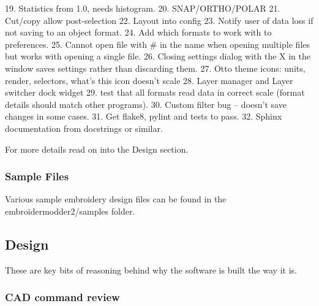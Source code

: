 \documentclass[a4paper, 11pt]{report}
\begin{document}
\begin{enumerate}
19. Statistics from 1.0, needs histogram.
20. SNAP/ORTHO/POLAR
21. Cut/copy allow post-selection
22. Layout into config
23. Notify user of data loss if not saving to an object format.
24. Add which formats to work with to preferences.
25. Cannot open file with \# in the name when opening multiple files but works with opening a single file.
26. Closing settings dialog with the X in the window saves settings rather than discarding them.
27. Otto theme icons: units, render, selectors, what's this icon doesn't scale
28. Layer manager and Layer switcher dock widget
29. test that all formats read data in correct scale (format details should match other programs).
30. Custom filter bug -- doesn't save changes in some cases.
31. Get flake8, pylint and tests to pass.
32. Sphinx documentation from docstrings or similar.
\end{enumerate}

For more details read on into the Design section.

\subsubsection{Sample Files}

Various sample embroidery design files can be found in the embroidermodder2/samples folder.

\subsection{Design}

These are key bits of reasoning behind why the software is built the way it is.

\subsubsection{CAD command review}
\end{document}
